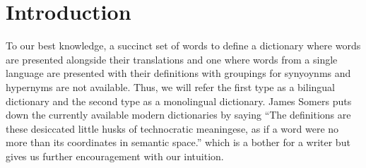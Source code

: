 
\chapter{Introduction} %
\label{Chapter1} %

To our best knowledge, a succinct set of words to define a dictionary where words are presented alongside their translations and one where words from a single language are presented with their definitions with groupings for synyoynms and hypernyms are not available.
Thus, we will refer the first type as a bilingual dictionary and the second type as a monolingual dictionary.
James Somers puts down the currently available modern dictionaries by saying \enquote{The definitions are these desiccated little husks of technocratic meaningese, as if a word were no more than its coordinates in semantic space.} which is a bother for a writer but gives us further encouragement with our intuition.
